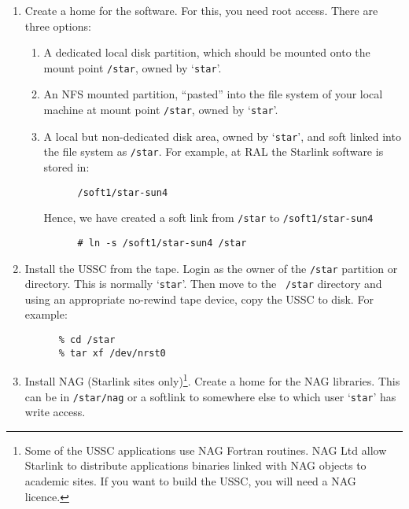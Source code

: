 \begin{enumerate}

\item Create a home for the software. For this, you need root access.
There are three options:

\begin{enumerate}

\item A dedicated local disk partition, which should be mounted onto the
mount point {\tt /star}, owned by `{\tt star}'.

\item An NFS mounted partition, ``pasted'' into the file system of your
local machine at mount point {\tt /star}, owned by `{\tt star}'.

\item A local but non-dedicated disk area, owned by `{\tt star}', and
soft linked into the file system as {\tt /star}. For example, at RAL the
Starlink software is stored in:

\begin{verbatim}
      /soft1/star-sun4
\end{verbatim}

Hence, we have created a soft link from {\tt /star} to {\tt /soft1/star-sun4}

\begin{verbatim}
      # ln -s /soft1/star-sun4 /star
\end{verbatim}

\end{enumerate}

\item Install the USSC from the tape. Login as the owner of the {\tt /star}
partition or directory. This is normally `{\tt star}'. Then move to the {\tt 
/star} directory and using an appropriate no-rewind tape device, copy the 
USSC to disk. For example:

\begin{verbatim}
      % cd /star
      % tar xf /dev/nrst0
\end{verbatim}

\item Install NAG (Starlink sites only)\footnote{Some of the USSC
applications use NAG Fortran routines. NAG Ltd allow Starlink to 
distribute applications binaries linked with NAG objects to academic
sites. If you want to build the USSC, you will need a NAG licence.}.
Create a home for the NAG libraries. This can be in {\tt /star/nag} 
or a softlink to somewhere else to which user `{\tt star}' has 
write access. 


\end{enumerate}
